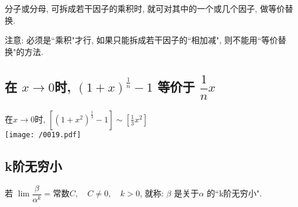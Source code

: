 \documentclass[UTF8]{ctexart}
\begin{document}
分子或分母, 可拆成若干因子的乘积时, 就可对其中的一个或几个因子, 做等价替换.

注意: 必须是``乘积"才行, 如果只能拆成若干因子的``相加减", 则不能用``等价替换"的方法.




\subsection{ 在 $x \to 0 $时,  $ (1+x)^{\frac{1} {n}} - 1 $ 等价于 $ \dfrac{1} {n} x $ } 


\begin{tcolorbox}[title = {例},boxrule={0.1em},colframe={black!10}, colback={black!3},colbacktitle={black!10},coltitle={black}]
 在$x \to 0 $时, 	$	\left[ \left( 1+x^2 \right) ^{\frac{1}{3}}-1 \right] \sim \left[ \frac{1}{3}x^2 \right] 	$ \\

	\texttt{[image: /0019.pdf]}
\end{tcolorbox}




\subsection{k阶无穷小 } 

若 $\lim \dfrac{\beta} {\alpha^k} =  \text{常数}C, \quad C \ne 0,\quad  k>0 $, 就称: $\beta$ 是关于$\alpha$ 的``k阶无穷小".
\end{document}
